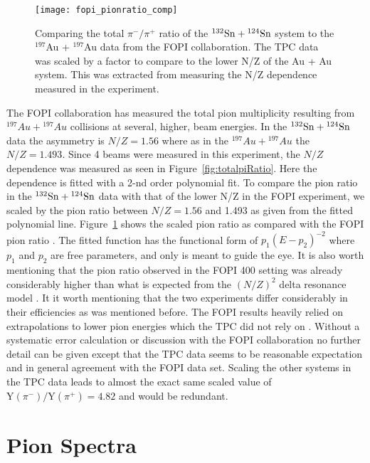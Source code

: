 \begin{figure}[!htb]
\centering
\texttt{[image: fopi\_pionratio\_comp]}
\caption{Comparing the total $\pi^-/\pi^+$ ratio of the ${}^{132}\mathrm{Sn} + {}^{124}\mathrm{Sn}$ system to the ${}^{197}$Au + ${}^{197}$Au data from the FOPI collaboration. The \spirit TPC data was scaled by a factor to compare to the lower N/Z of the Au + Au system. This was extracted from measuring the N/Z dependence measured in the experiment. }
\label{fig:fopiPionRatio}
\end{figure}

The FOPI collaboration has measured the total pion multiplicity resulting from ${}^{197}Au + {}^{197}Au$ collisions at several, higher, beam energies. In the ${}^{132}\mathrm{Sn} + {}^{124}\mathrm{Sn}$ data the asymmetry is $N/Z=1.56$ where as in the ${}^{197}Au + {}^{197}Au$ the $N/Z=1.493$. Since 4 beams were measured in this experiment, the $N/Z$ dependence was measured as seen in Figure~\ref{fig:totalpiRatio}. Here the dependence is fitted with a 2-nd order polynomial fit. To compare the pion ratio in the ${}^{132}\mathrm{Sn} + {}^{124}\mathrm{Sn}$ data with that of the lower N/Z in the FOPI experiment, we scaled by the pion ratio between $N/Z=1.56$ and 1.493 as given from the fitted polynomial line. Figure~\ref{fig:fopiPionRatio} shows the scaled pion ratio as compared with the FOPI pion ratio \cite{fopi}. The fitted function has the functional form of $p_1(E - p_2)^{-2}$ where $p_1$ and $p_2$ are free parameters, and only is meant to guide the eye. It is also worth mentioning that the pion ratio observed in the FOPI \SI{400}{\MeVA} setting was already considerably higher than what is expected from the $(N/Z)^2$ delta resonance model \cite{baoan_piprod1,baoan_piprod2}. It it worth mentioning that the two experiments differ considerably in their efficiencies as was mentioned before. The FOPI results heavily relied on extrapolations to lower pion energies which the \spirit TPC did not rely on \cite{fopi}. Without a systematic error calculation or discussion with the FOPI collaboration no further detail can be given except that the \spirit TPC data seems to be reasonable expectation and in general agreement with the FOPI data set. Scaling the other systems in the \spirit TPC data leads to almost the exact same scaled value of $\mathrm{Y}(\pi^-)/\mathrm{Y}(\pi^+) = \num{4.82}$ and would be redundant. 




\section{Pion Spectra}
\label{sec:pionSpectra}



